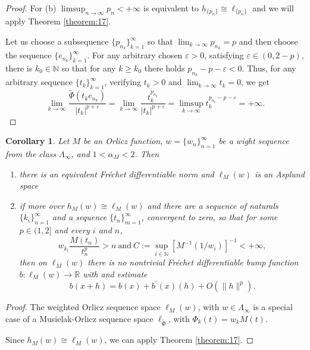 \documentclass[12pt]{article}
\theoremstyle{thmstyleone}%
\newtheorem{cor}[theorem]{Corollary}%
\theoremstyle{thmstyletwo}%
\theoremstyle{thmstylethree}%
\begin{document}
{\begin{proof}
	For (b) $\limsup_{n\to\infty}p_n<+\infty$ is equivalent to $h_{\{p_n\}}\cong\ell_{\{p_n\}}$
	and we will apply Theorem \ref{theorem:17}.
	
	Let us choose a subsequence $\{p_{n_k}\}_{k=1}^\infty$ so that $\lim_{k\to\infty}p_{n_k}=p$ and then choose the sequence $\{e_{n_k}\}_{k=1}^\infty$. For any arbitrary chosen $\varepsilon>0${, satisfying $\varepsilon\in (0,2-p)$,} there is $k_0\in\mathbb{N}$ so that for any $k\geq k_0$ there holds $p_{n_k}-p-\varepsilon<0$. Thus, for any arbitrary sequence $\{t_k\}_{k=1}^\infty$, verifying $t_k>0$ and $\lim_{k\to\infty}t_k=0$, we get
	$$
	\lim_{k \to \infty}\frac{\widetilde{\Phi}\left({t_ke_{n_k}}\right)}{|t_k|^{p+\varepsilon}}
	=\lim_{k \to \infty}\frac{{t_k^{p_{n_k}}}}{|t_k|^{p+\varepsilon}}
	=\limsup_{k \to \infty}t_k^{p_{n_k}-p-\varepsilon}=+\infty.
	$$
\end{proof}

{\begin{cor}\label{corollary:19}
	Let $M$ be an Orlicz function, $w=\{w_n\}_{n=1}^\infty$ be a wight sequence from the class $\Lambda_\infty$, and $1< \alpha_M<2$. Then 
	\begin{enumerate}
		\item there is an equivalent Fr\'{e}chet differentiable norm and $\ell_M(w)$ is an Asplund space
		\item if more over $h_M(w)\cong\ell_M(w)$ and there are a sequence of naturals
		$\{k_i\}_{n=1}^\infty$ and a sequence $\{t_n\}_{m=1}^\infty$, convergent to zero, so that for some $p\in (1,2]$ and  every $i$ and $n$, 
		$$
		w_{k_i}\frac{M(t_n)}{t_n^p}>n\ \mbox{and}\ C:=\sup_{i\in \mathbb{N}}\left[M^{-1}(1/w_i)\right]^{-1}<+\infty,
		$$ 
		then on $\ell_M(w)$ there is no nontrivial Fr\'{e}chet differentiable bump function $b:\ell_M(w)\to\mathbb{R}$ with and estimate
		$$
		b(x+h)=b(x)+b^{\prime}(x)(h)+O(\|h\|^p).
		$$ 
	\end{enumerate}
\end{cor}
\begin{proof}
	The weighted Orlicz sequence space $\ell_{M}(w)$, with $w\in\Lambda_\infty$ is a special case of a 
	Musielak-Orlicz sequence space $\ell_{\widetilde{\Phi}}$, with $\Phi_k(t)=w_kM(t)$.
	
	Since $h_M(w)\cong\ell_M(w)$, we can apply Theorem \ref{theorem:17}.
\end{proof}}

}
\end{document}
